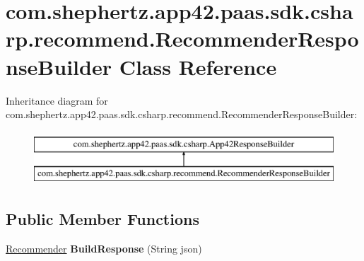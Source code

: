 \hypertarget{classcom_1_1shephertz_1_1app42_1_1paas_1_1sdk_1_1csharp_1_1recommend_1_1_recommender_response_builder}{\section{com.\+shephertz.\+app42.\+paas.\+sdk.\+csharp.\+recommend.\+Recommender\+Response\+Builder Class Reference}
\label{classcom_1_1shephertz_1_1app42_1_1paas_1_1sdk_1_1csharp_1_1recommend_1_1_recommender_response_builder}
}
Inheritance diagram for com.\+shephertz.\+app42.\+paas.\+sdk.\+csharp.\+recommend.\+Recommender\+Response\+Builder\+:\begin{figure}[H]
\begin{center}
\leavevmode
\includegraphics[height=2.000000cm]{classcom_1_1shephertz_1_1app42_1_1paas_1_1sdk_1_1csharp_1_1recommend_1_1_recommender_response_builder}
\end{center}
\end{figure}
\subsection*{Public Member Functions}
\begin{DoxyCompactItemize}
\item 
\hypertarget{classcom_1_1shephertz_1_1app42_1_1paas_1_1sdk_1_1csharp_1_1recommend_1_1_recommender_response_builder_aeb3581f28b14ffb1a695be8129b31a83}{\hyperlink{classcom_1_1shephertz_1_1app42_1_1paas_1_1sdk_1_1csharp_1_1recommend_1_1_recommender}{Recommender} {\bfseries Build\+Response} (String json)}\label{classcom_1_1shephertz_1_1app42_1_1paas_1_1sdk_1_1csharp_1_1recommend_1_1_recommender_response_builder_aeb3581f28b14ffb1a695be8129b31a83}

\end{DoxyCompactItemize}
